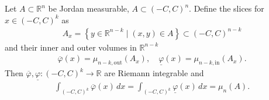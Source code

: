 \begin{theorem}[Cavalieri]\label{thm:cavalieri}
	Let $A \subset \mathbb{R}^{n}$ be Jordan measurable, $A \subset (-C, C)^{n}$. Define the slices for $x \in (-C, C)^{k}$ as
	\begin{align*}
		A_{x} = \left\{ y \in \mathbb{R}^{n-k} \mid (x,y) \in A \right\} \subset (-C, C)^{n-k}
	\end{align*}
	and their inner and outer volumes in $\mathbb{R}^{n-k}$
	\begin{align*}
		\overline{ \varphi } (x) = \mu_{n-k, \text{out}}(A_{x}), \quad \underline{ \varphi}(x) = \mu_{n-k, \text{in}}(A_{x}).
	\end{align*}
	Then $\overline{ \varphi }, \underline{\varphi}: (-C, C)^{k} \to \mathbb{R}$ are Riemann integrable and
	\begin{align*}
		\int_{(-C, C)^{k}} \overline{ \varphi }(x)  \, dx = \int_{(-C, C)^{k}} \underline{ \varphi }(x) \, dx = \mu_{n}(A).
	\end{align*}
\end{theorem}

